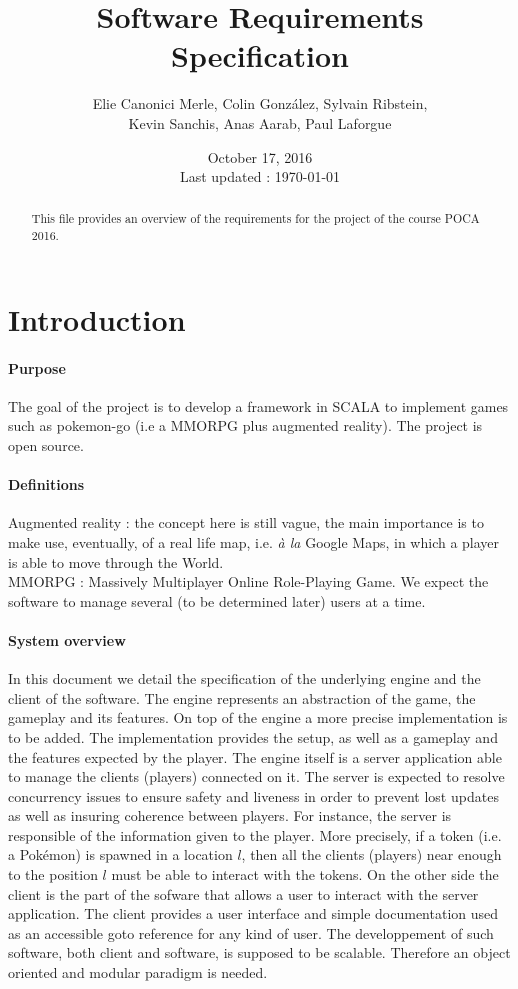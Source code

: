 \documentclass[a4paper,09pt]{article}
\author{Elie Canonici Merle, Colin González, Sylvain Ribstein, \\
  Kevin Sanchis, Anas Aarab, Paul Laforgue}
\title{Software Requirements Specification}
\date{October 17, 2016 \\ \small Last updated : \today}
\begin{document}
\maketitle

\begin{abstract}
  This file provides an overview of the requirements for the project of the
  course POCA 2016.
\end{abstract}

\section*{Introduction}

\paragraph{Purpose}

The goal of the project is to develop a framework in SCALA to implement games
such as pokemon-go (i.e a MMORPG plus augmented reality).
The project is open source.

\paragraph{Definitions}
Augmented reality : the concept here is still vague, the main importance is
to make use, eventually, of a real life map, i.e. \textit{à la} Google Maps, in
which a player is able to move through the World.\\
MMORPG : Massively Multiplayer Online Role-Playing Game.
We expect the software to manage several (to be determined later) users at a time.

\paragraph{System overview}
In this document we detail the specification of the underlying engine and the
client of the software. The engine represents an abstraction of the game, the
gameplay and its features. On top of the engine a more precise implementation
is to be added. The implementation provides the setup, as well as a gameplay
and the features expected by the player. The engine itself is a server
application able to manage the clients (players) connected on it. The server is
expected to resolve concurrency issues to ensure safety and liveness in order to
prevent lost updates as well as insuring coherence between players.
For instance, the server is responsible of the information given to the player.
More precisely, if a token (i.e. a Pokémon) is spawned in a location $l$,
then all the clients (players) near enough to the position $l$ must be able to
interact with the tokens. On the other side the client is the part of the
sofware that allows a user to interact with the server application. The client
provides a user interface and simple documentation used as an accessible goto
reference for any kind of user. The developpement of such software, both client
and software, is supposed to be scalable. Therefore an object oriented and
modular paradigm is needed.
\end{document}
